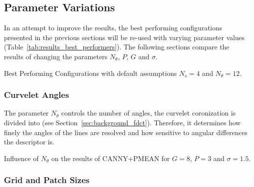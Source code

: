 \subsection{Parameter Variations}

In an attempt to improve the results, the best performing configurations
presented in the previous sections will be re-used with varying parameter
values (Table~\ref{tab:results_best_performers}). The following sections
compare the results of changing the parameters $N_{\theta}$, $P$, $G$ and
$\sigma$.

\begin{table}[h]
    \centering
    \resultsbestperformers
    \caption[Best Performing Configurations]{
        Best Performing Configurations with default assumptions $N_s=4$ and
        $N_{\theta}=12$.
    }
    \label{tab:results_best_performers}
\end{table}

\FloatBarrier
\subsubsection{Curvelet Angles}

The parameter $N_{\theta}$ controls the number of angles, the curvelet
coronization is divided into (see Section~\ref{sec:background_fdct}).
Therefore, it determines how finely the angles of the lines are resolved and
how sensitive to angular differences the descriptor is.

\begin{table}[h]
    \centering
    \resultsparameterangles
    \caption[Angle Parameter Results]{
        Influence of $N_{\theta}$ on the results of CANNY+PMEAN for $G=8$,
        $P=3$ and $\sigma=1.5$.
    }
    \label{tab:results_parameter_angles}
\end{table}

\FloatBarrier
\subsubsection{Grid and Patch Sizes}

